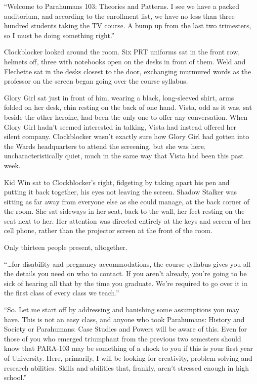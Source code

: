 





``Welcome to Parahumans 103: Theories and Patterns.  I see we have a packed auditorium, and according to the enrollment list, we have no less than three hundred students taking the TV course.  A bump up from the last two trimesters, so I must be doing something right.''



Clockblocker looked around the room.  Six PRT uniforms sat in the front row, helmets off, three with notebooks open on the desks in front of them.  Weld and Flechette sat in the desks closest to the door, exchanging murmured words as the professor on the screen began going over the course syllabus.



Glory Girl sat just in front of him, wearing a black, long-sleeved shirt, arms folded on her desk, chin resting on the back of one hand.  Vista, odd as it was, sat beside the other heroine, had been the only one to offer any conversation.  When Glory Girl hadn't seemed interested in talking, Vista had instead offered her silent company.  Clockblocker wasn't exactly sure how Glory Girl had gotten into the Wards headquarters to attend the screening, but she was here, uncharacteristically quiet, much in the same way that Vista had been this past week.



Kid Win sat to Clockblocker's right, fidgeting by taking apart his pen and putting it back together, his eyes not leaving the screen.  Shadow Stalker was sitting as far away from everyone else as she could manage, at the back corner of the room.  She sat sideways in her seat, back to the wall, her feet resting on the seat next to her.  Her attention was directed entirely at the keys and screen of her cell phone, rather than the projector screen at the front of the room.



Only thirteen people present, altogether.



``\ldots{}for disability and pregnancy accommodations, the course syllabus gives you all the details you need on who to contact.  If you aren't already, you're going to be sick of hearing all that by the time you graduate.  We're required to go over it in the first class of every class we teach.''



``So.  Let me start off by addressing and banishing some assumptions you may have.  This is not an easy class, and anyone who took Parahumans: History and Society or Parahumans: Case Studies and Powers will be aware of this.  Even for those of you who emerged triumphant from the previous two semesters should know that PARA-103 may be something of a shock to you if this is your first year of University.  Here, primarily, I will be looking for creativity, problem solving and research abilities.  Skills and abilities that, frankly, aren't stressed enough in high school.''



